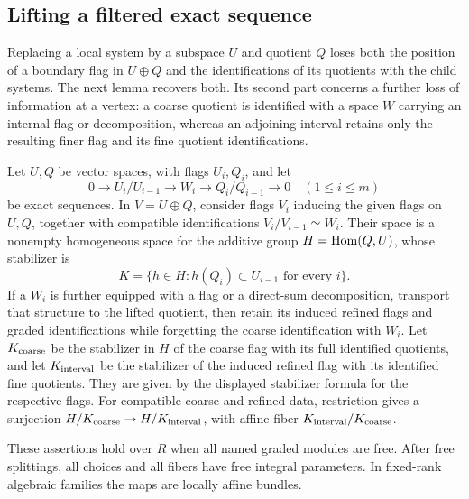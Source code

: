 \subsection{Lifting a filtered exact sequence}

Replacing a local system by a subspace $U$ and quotient $Q$ loses both
the position of a boundary flag in $U\oplus Q$ and the identifications
of its quotients with the child systems.  The next lemma recovers both.
Its second part concerns a further loss of information at a vertex:
a coarse quotient is identified with a space $W$ carrying an internal
flag or decomposition, whereas an adjoining interval retains only the
resulting finer flag and its fine quotient identifications.

\begin{lemma}\label{lem:filtered-lift}
Let $U,Q$ be vector spaces, with flags $U_i,Q_i$, and let
\[
 0\longrightarrow U_i/U_{i-1}\longrightarrow W_i
 \longrightarrow Q_i/Q_{i-1}\longrightarrow0
 \quad(1\leq i\leq m)
\]
be exact sequences.  In $V=U\oplus Q$, consider flags $V_i$ inducing
the given flags on $U,Q$, together with compatible identifications
$V_i/V_{i-1}\simeq W_i$.  Their space is a nonempty homogeneous space
for the additive group $H=\operatorname{Hom}(Q,U)$, whose stabilizer is
\[
 K=\{h\in H:h(Q_i)\subset U_{i-1}\text{ for every }i\}.
\]
If a $W_i$ is further equipped with a flag or a direct-sum
decomposition, transport that structure to the lifted quotient,
then retain its induced refined flags and graded identifications
while forgetting the coarse identification with $W_i$.
Let $K_{\rm coarse}$ be the stabilizer in $H$ of the coarse flag
with its full identified quotients, and let $K_{\rm interval}$ be
the stabilizer of the induced refined flag with its identified
fine quotients.  They are given by the displayed stabilizer formula
for the respective flags.  For compatible coarse and refined data,
restriction gives a surjection
$H/K_{\rm coarse}\to H/K_{\rm interval}$, with affine fiber
$K_{\rm interval}/K_{\rm coarse}$.

These assertions hold over $R$ when all named graded modules are free.
After free splittings, all choices and all fibers have free integral
parameters.  In fixed-rank algebraic families the maps are locally
affine bundles.
\end{lemma}

